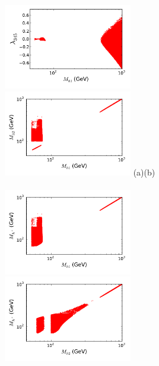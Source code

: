 \begin{figure}[htb]
\hspace*{-0.2cm}\includegraphics[width=0.50\textwidth]{Figures/Mh1_ld345_Omega_zoom-cut123456789_zz-large-monoc.pdf}%
\hspace*{-0.2cm}\includegraphics[width=0.50\textwidth]{Figures/Mh1_Mh2_Omega_zoom-cut123456789_zz-large-monoc.pdf}
\vskip -1.0cm
\hspace*{1cm}(a)\hspace*{0.55\textwidth}\hspace*{-1.5cm}(b)
\\
\\
\hspace*{-0.2cm}\includegraphics[width=0.50\textwidth]{Figures/Mh1_Mhc_Omega_zoom-cut123456789_zz-large-monoc.pdf}%
\hspace*{-0.2cm}\includegraphics[width=0.50\textwidth]{Figures/Mhc_Mh2_Omega_zoom-cut123456789_zz-large-monoc.pdf}

\end{figure}
